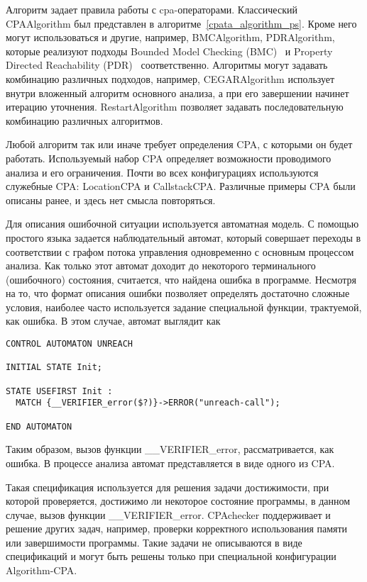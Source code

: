 Алгоритм задает правила работы с cpa-операторами. Классический CPAAlgorithm был представлен в алгоритме~\ref{cpata_algorithm_ps}.
Кроме него могут использоваться и другие, например, BMCAlgorithm, PDRAlgorithm, которые реализуют подходы Bounded Model Checking (BMC)~\cite{BMC} и Property Directed Reachability (PDR)~\cite{PDR} соответственно.
Алгоритмы могут задавать комбинацию различных подходов, например, CEGARAlgorithm использует внутри вложенный алгоритм основного анализа, а при его завершении начинет итерацию уточнения.
RestartAlgorithm позволяет задавать последовательную комбинацию различных алгоритмов.

Любой алгоритм так или иначе требует определения CPA, с которыми он будет работать.
Используемый набор CPA определяет возможности проводимого анализа и его ограничения.
Почти во всех конфигурациях используются служебные CPA: LocationCPA и CallstackCPA. 
Различные примеры CPA были описаны ранее, и здесь нет смысла повторяться.

Для описания ошибочной ситуации используется автоматная модель. 
С помощью простого языка задается наблюдательный автомат, который совершает переходы в соответствии с графом потока управления одновременно с основным процессом анализа. 
Как только этот автомат доходит до некоторого терминального (ошибочного) состояния, считается, что найдена ошибка в программе.
Несмотря на то, что формат описания ошибки позволяет определять достаточно сложные условия, наиболее часто используется задание специальной функции, трактуемой, как ошибка.
В этом случае, автомат выглядит как
\begin{verbatim}
CONTROL AUTOMATON UNREACH

INITIAL STATE Init;

STATE USEFIRST Init :
  MATCH {__VERIFIER_error($?)}->ERROR("unreach-call");

END AUTOMATON
\end{verbatim}
Таким образом, вызов функции \_\_VERIFIER\_error, рассматривается, как ошибка. 
В процессе анализа автомат представляется в виде одного из CPA.

Такая спецификация используется для решения задачи достижимости, при которой проверяется, достижимо ли некоторое состояние программы, в данном случае, вызов функции \_\_VERIFIER\_error.
CPAchecker поддерживает и решение других задач, например, проверки корректного использования памяти или завершимости программы.
Такие задачи не описываются в виде спецификаций и могут быть решены только при специальной конфигурации Algorithm-CPA.

